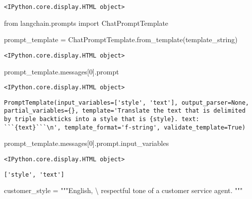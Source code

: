 \documentclass[
  letterpaper,
  DIV=11,
  numbers=noendperiod]{scrreprt}
\newenvironment{Shaded}{\begin{snugshade}}{\end{snugshade}}
\newcommand{\CharTok}[1]{\textcolor[rgb]{0.13,0.47,0.30}{#1}}
\newcommand{\DecValTok}[1]{\textcolor[rgb]{0.68,0.00,0.00}{#1}}
\newcommand{\ImportTok}[1]{\textcolor[rgb]{0.00,0.46,0.62}{#1}}
\newcommand{\NormalTok}[1]{\textcolor[rgb]{0.00,0.23,0.31}{#1}}
\newcommand{\OperatorTok}[1]{\textcolor[rgb]{0.37,0.37,0.37}{#1}}
\newcommand{\StringTok}[1]{\textcolor[rgb]{0.13,0.47,0.30}{#1}}
\begin{document}
\begin{verbatim}
<IPython.core.display.HTML object>
\end{verbatim}

\begin{Shaded}
\begin{Highlighting}[]
\ImportTok{from}\NormalTok{ langchain.prompts }\ImportTok{import}\NormalTok{ ChatPromptTemplate}

\NormalTok{prompt\_template }\OperatorTok{=}\NormalTok{ ChatPromptTemplate.from\_template(template\_string)}
\end{Highlighting}
\end{Shaded}

\begin{verbatim}
<IPython.core.display.HTML object>
\end{verbatim}

\begin{Shaded}
\begin{Highlighting}[]
\NormalTok{prompt\_template.messages[}\DecValTok{0}\NormalTok{].prompt}
\end{Highlighting}
\end{Shaded}

\begin{verbatim}
<IPython.core.display.HTML object>
\end{verbatim}

\begin{verbatim}
PromptTemplate(input_variables=['style', 'text'], output_parser=None, partial_variables={}, template='Translate the text that is delimited by triple backticks into a style that is {style}. text: ```{text}```\n', template_format='f-string', validate_template=True)
\end{verbatim}

\begin{Shaded}
\begin{Highlighting}[]
\NormalTok{prompt\_template.messages[}\DecValTok{0}\NormalTok{].prompt.input\_variables}
\end{Highlighting}
\end{Shaded}

\begin{verbatim}
<IPython.core.display.HTML object>
\end{verbatim}

\begin{verbatim}
['style', 'text']
\end{verbatim}

\begin{Shaded}
\begin{Highlighting}[]
\NormalTok{customer\_style }\OperatorTok{=} \StringTok{"""English, }\CharTok{\textbackslash{}}
\StringTok{ respectful tone of a customer service agent.}
\StringTok{"""}
\end{Highlighting}
\end{Shaded}
\end{document}
